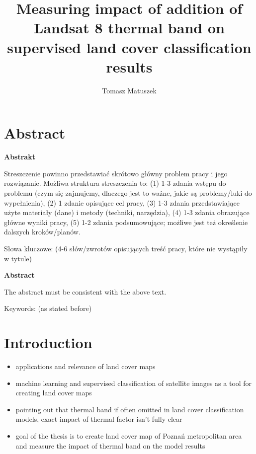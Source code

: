 \documentclass{amuthesis}
\author{Tomasz Matuszek}
\title{Measuring impact of addition of Landsat 8 thermal band on
supervised land cover classification results}
\begin{document}

\titlepage


\hypertarget{abstract}{%
\chapter*{Abstract}\label{abstract}}

\textbf{Abstrakt}

Streszczenie powinno przedstawiać skrótowo główny problem pracy i jego
rozwiązanie. Możliwa struktura streszczenia to: (1) 1-3 zdania wstępu do
problemu (czym się zajmujemy, dlaczego jest to ważne, jakie są
problemy/luki do wypełnienia), (2) 1 zdanie opisujące cel pracy, (3) 1-3
zdania przedstawiające użyte materiały (dane) i metody (techniki,
narzędzia), (4) 1-3 zdania obrazujące główne wyniki pracy, (5) 1-2
zdania podsumowujące; możliwe jest też określenie dalszych
kroków/planów.

Słowa kluczowe: (4-6 słów/zwrotów opisujących treść pracy, które nie
wystąpiły w tytule)

\textbf{Abstract}

The abstract must be consistent with the above text.

Keywords: (as stated before)

\newpage

\sf\tighttoc\doublespacing


\hypertarget{sec-intro}{%
\chapter{Introduction}\label{sec-intro}}

\begin{itemize}
\item
  applications and relevance of land cover maps
\item
  machine learning and supervised classification of satellite images as
  a tool for creating land cover maps
\item
  pointing out that thermal band if often omitted in land cover
  classification models, exact impact of thermal factor isn't fully
  clear
\item
  goal of the thesis is to create land cover map of Poznań metropolitan
  area and measure the impact of thermal band on the model results
\end{itemize}
\end{document}
